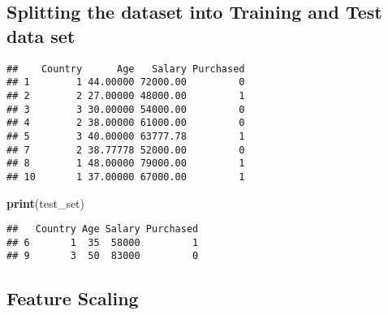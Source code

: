\documentclass[
]{article}
\newenvironment{Shaded}{\begin{snugshade}}{\end{snugshade}}
\newcommand{\AttributeTok}[1]{\textcolor[rgb]{0.13,0.29,0.53}{#1}}
\newcommand{\ConstantTok}[1]{\textcolor[rgb]{0.56,0.35,0.01}{#1}}
\newcommand{\DecValTok}[1]{\textcolor[rgb]{0.00,0.00,0.81}{#1}}
\newcommand{\FloatTok}[1]{\textcolor[rgb]{0.00,0.00,0.81}{#1}}
\newcommand{\FunctionTok}[1]{\textcolor[rgb]{0.13,0.29,0.53}{\textbf{#1}}}
\newcommand{\NormalTok}[1]{#1}
\newcommand{\OtherTok}[1]{\textcolor[rgb]{0.56,0.35,0.01}{#1}}
\newcommand{\SpecialCharTok}[1]{\textcolor[rgb]{0.81,0.36,0.00}{\textbf{#1}}}
\begin{document}
\hypertarget{splitting-the-dataset-into-training-and-test-data-set}{%
\subsection{Splitting the dataset into Training and Test data
set}\label{splitting-the-dataset-into-training-and-test-data-set}}

\begin{Shaded}
\end{Shaded}

\begin{verbatim}
##    Country      Age   Salary Purchased
## 1        1 44.00000 72000.00         0
## 2        2 27.00000 48000.00         1
## 3        3 30.00000 54000.00         0
## 4        2 38.00000 61000.00         0
## 5        3 40.00000 63777.78         1
## 7        2 38.77778 52000.00         0
## 8        1 48.00000 79000.00         1
## 10       1 37.00000 67000.00         1
\end{verbatim}

\begin{Shaded}
\begin{Highlighting}[]
\FunctionTok{print}\NormalTok{(test\_set)}
\end{Highlighting}
\end{Shaded}

\begin{verbatim}
##   Country Age Salary Purchased
## 6       1  35  58000         1
## 9       3  50  83000         0
\end{verbatim}

\hypertarget{feature-scaling}{%
\subsection{Feature Scaling}\label{feature-scaling}}
\end{document}
